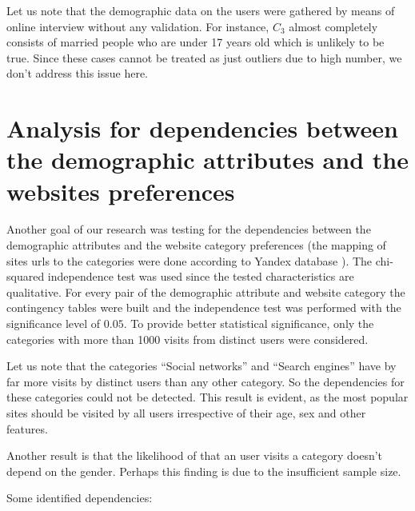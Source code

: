 \documentclass[runningheads,a4paper]{llncs}
\begin{document}
Let us note that the demographic data on the users were gathered by means of online interview without any validation. For instance, $C_3$ almost completely consists of married people who are under 17 years old which is unlikely to be true. Since these cases cannot be treated as just outliers due to high number, we don't address this issue here.


\section{Analysis for dependencies between the demographic attributes and the websites preferences}



Another goal of our research was testing for the dependencies between the demographic attributes and the website category preferences (the mapping of sites urls to the categories were done according to Yandex database \cite{yandex}). The chi-squared independence test was used since the tested characteristics are qualitative. For every pair of the demographic attribute and website category the contingency tables were built and the independence test was performed with the significance level of $0.05$. To provide better statistical significance, only the categories with more than 1000 visits from distinct users were considered.

Let us note that the categories ``Social networks'' and ``Search engines'' have by far more visits by distinct users than any other category. So the dependencies for these categories could not be detected. This result is evident, as the most popular sites should be visited by all users irrespective of their age, sex and other features. 

Another result is that the likelihood of that an user visits a category doesn't depend on the gender. Perhaps this finding is due to the insufficient sample size.

Some identified dependencies:
\end{document}
